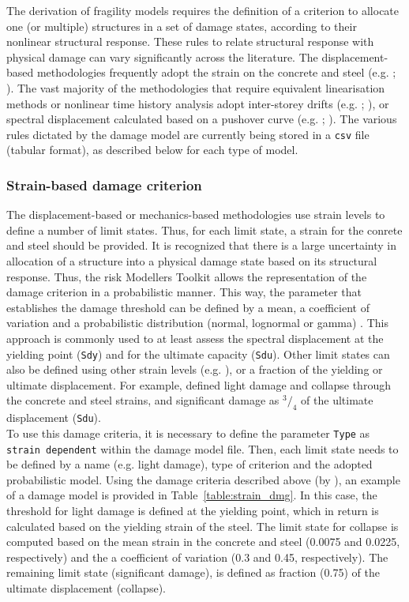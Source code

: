 The derivation of fragility models requires the definition of a criterion to allocate one (or multiple) structures in a set of damage states, according to their nonlinear structural response. These rules to relate structural response with physical damage can vary significantly across the literature. The displacement-based methodologies frequently adopt the strain on the concrete and steel (e.g. \cite{BorziEtAl2008b}; \cite{SilvaEtAl2013}). The vast majority of the methodologies that require equivalent linearisation methods or nonlinear time history analysis adopt inter-storey drifts (e.g. \cite{VamvatsikosCornell2005}; \cite{RossettoElnashai2005}), or spectral displacement calculated based on a pushover curve (e.g. \cite{Erberik2008}; \cite{SilvaEtAl2014c}). The various rules dictated by the damage model are currently being stored in a \verb=csv= file (tabular format), as described below for each type of model.

\subsubsection{Strain-based damage criterion}
\label{subsubsec:strain-dmg}
The displacement-based \citep{CrowleyEtAl2004} or mechanics-based \citep{BorziEtAl2008b} methodologies use strain levels to define a number of limit states. Thus, for each limit state, a strain for the conrete and steel should be provided. It is recognized that there is a large uncertainty in allocation of a structure into a physical damage state based on its structural response. Thus, the risk Modellers Toolkit allows the representation of the damage criterion in a probabilistic manner. This way, the parameter that establishes the damage threshold can be defined by a mean, a coefficient of variation and a probabilistic distribution (normal, lognormal or gamma) \citep{SilvaEtAl2013}. This approach is commonly used to at least assess the spectral displacement at the yielding point (\verb=Sdy=) and for the ultimate capacity (\verb=Sdu=). Other limit states can also be defined using other strain levels (e.g. \cite{CrowleyEtAl2004}), or a fraction of the yielding or ultimate displacement. For example, \cite{BorziEtAl2008b} defined light damage and collapse through the concrete and steel strains, and significant damage as $^3/_4$ of the ultimate displacement (\verb=Sdu=).\\

To use this damage criteria, it is necessary to define the parameter \verb=Type= as \verb=strain dependent= within the damage model file. Then, each limit state needs to be defined by a name (e.g. light damage), type of criterion and the adopted probabilistic model. Using the damage criteria described above (by \cite{BorziEtAl2008b}), an example of a damage model is provided in Table~\ref{table:strain_dmg}. In this case, the threshold for light damage is defined at the yielding point, which in return is calculated based on the yielding strain of the steel. The limit state for collapse is computed based on the mean strain in the concrete and steel (0.0075 and 0.0225, respectively) and the a coefficient of variation (0.3 and 0.45, respectively). The remaining limit state (significant damage), is defined as fraction (0.75) of the ultimate displacement (collapse).

